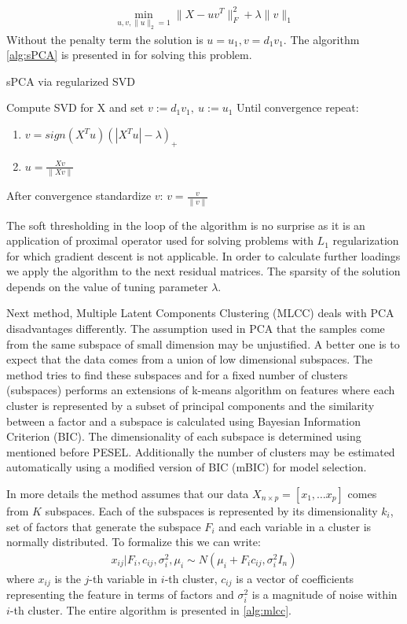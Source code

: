 \documentclass[shortabstract, english, mgr]{iithesis}
\begin{document}
\begin{align*}
    \min_{u,v, \|u\|_2=1}\|X - uv^T\|_F^2 + \lambda \| v \|_1
\end{align*}
Without the penalty term the solution is $u = u_1, v=d_1v_1$. The algorithm \ref{alg:sPCA} is presented in \cite{SPCAnew} for solving this problem.
\begin{algorithm}
\caption{sPCA via regularized SVD}
\label{alg:sPCA}          
\begin{algorithmic}                    
    \STATE Compute SVD for X and set $v := d_1v_1, \ u := u_1$
    \STATE Until convergence repeat:
    \begin{enumerate}
        \item $v = sign(X^Tu)(|X^Tu| - \lambda)_+$
        \item $u = \frac{Xv}{\|Xv\|}$
    \end{enumerate}
    \STATE After convergence standardize $v$: $v = \frac{v}{\|v\|}$
\end{algorithmic}
\end{algorithm}

The soft thresholding in the loop of the algorithm is no surprise as it is an application of proximal operator used for solving problems with $L_1$ regularization for which gradient descent is not applicable. In order to calculate further loadings we apply the algorithm to the next residual matrices. The sparsity of the solution depends on the value of tuning parameter $\lambda$.

Next method, Multiple Latent Components Clustering (MLCC) deals with PCA disadvantages differently. The assumption used in PCA that the samples come from the same subspace of small dimension may be unjustified. A better one is to expect that the data comes from a union of low dimensional subspaces. The method tries to find these subspaces and for a fixed number of clusters (subspaces) performs an extensions of k-means algorithm on features where each cluster is represented by a subset of principal components and the similarity between a factor and a subspace is calculated using Bayesian Information Criterion (BIC). The dimensionality of each subspace is determined using mentioned before PESEL. Additionally the number of clusters may be estimated automatically using a modified version of BIC (mBIC) for model selection. 

In more details the method assumes that our data $X_{n\times p} = [x_1, \ldots x_p]$ comes from $K$ subspaces. Each of the subspaces is represented by its dimensionality $k_i$, set of factors that generate the subspace $F_i$ and each variable in a cluster is normally distributed. To formalize this we can write:
\begin{align*}
    x_{i j} | F_{i}, c_{i j}, \sigma_{i}^{2}, \mu_{i} \sim N\left(\mu_{i} + F_{i} c_{i j}, \sigma_{i}^{2} I_{n}\right)
\end{align*} 
where $x_{ij}$ is the $j$-th variable in $i$-th cluster, $c_{ij}$ is a vector of coefficients representing the feature in terms of factors and $\sigma_i^2$ is a magnitude of noise within $i$-th cluster. The entire algorithm is presented in \ref{alg:mlcc}.
\end{document}
